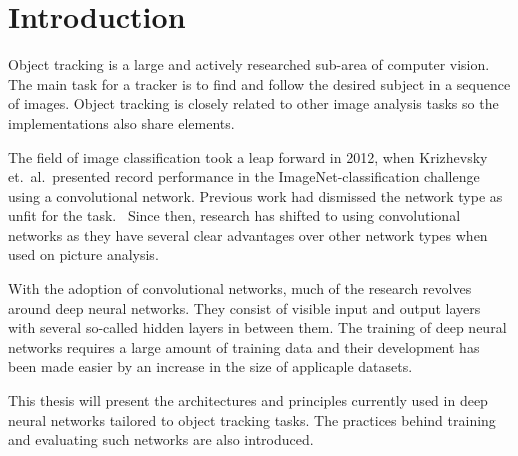 \section{Introduction}

Object tracking is a large and actively researched sub-area of computer vision. The
main task for a tracker is to find and follow the desired subject in a sequence of
images. Object tracking is closely related to other image analysis tasks so the
implementations also share elements.

The field of image classification took a leap forward in 2012, when
Krizhevsky et.~al.~presented record performance in the ImageNet-classification
challenge using a convolutional network. Previous work had dismissed the network
type as unfit for the task.~\cite{NIPS_IMAGENET} Since then, research has shifted
to using convolutional networks as they have several clear advantages over
other network types when used on picture analysis.

With the adoption of convolutional networks, much of the research revolves around
deep neural networks. They consist of visible input and output layers with several
so-called hidden layers in between them. The training of deep neural networks
requires a large amount of training data and their development has been made easier
by an increase in the size of applicaple datasets.

This thesis will present the architectures and principles currently used in deep
neural networks tailored to object tracking tasks. The practices behind training
and evaluating such networks are also introduced.
